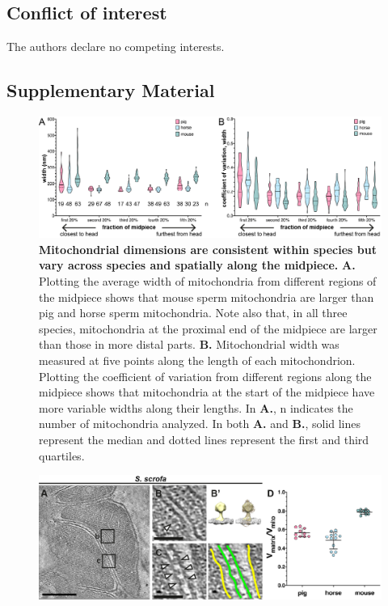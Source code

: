 \subsection*{Conflict of interest}
The authors declare no competing interests.
\clearpage
\begin{subappendices}
	\makeatletter\renewcommand{\thetable}{\thechapter.A.\@arabic\c@table}
	\makeatother
	\section{Supplementary Material}
	\begin{figure}[hbt]
		\center
		\includegraphics[]{Chapter.4/Figures/SI_Figure1.png}
		\caption{\textbf{Mitochondrial dimensions are consistent within species but vary across species and spatially along the midpiece.} \textbf{A.} Plotting the average width of mitochondria from different regions of the midpiece shows that mouse sperm mitochondria are larger than pig and horse sperm mitochondria. Note also that, in all three species, mitochondria at the proximal end of the midpiece are larger than those in more distal parts. \textbf{B.} Mitochondrial width was measured at five points along the length of each mitochondrion. Plotting the coefficient of variation from different regions along the midpiece shows that mitochondria at the start of the midpiece have more variable widths along their lengths. In \textbf{A.}, n indicates the number of mitochondria analyzed. In both \textbf{A.} and \textbf{B.}, solid lines represent the median and dotted lines represent the first and third quartiles.}
		\label{fig:ch4_app_fig1}
	\end{figure}
	\begin{figure}[hbt]
		\center
		\includegraphics[]{Chapter.4/Figures/SI_Figure2.png}

\end{figure}
\end{subappendices}
